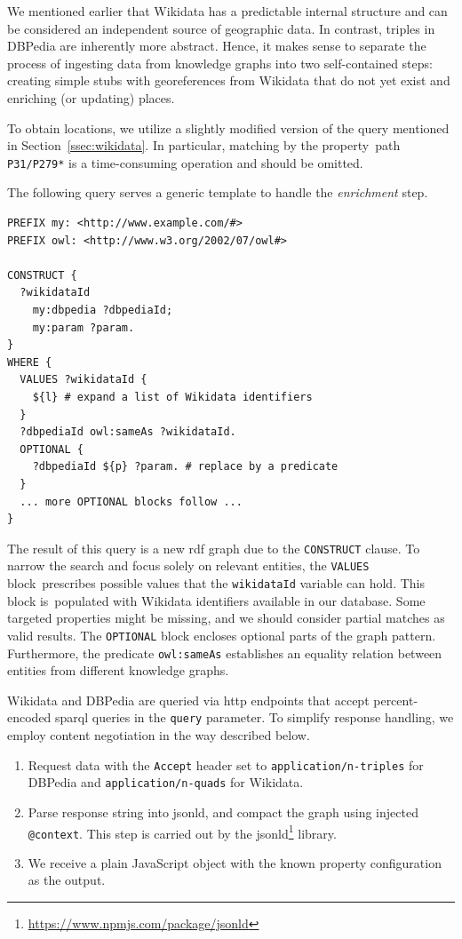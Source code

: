 We mentioned earlier that Wikidata has a predictable internal structure and can be considered an independent source of geographic data. In contrast, triples in DBPedia are inherently more abstract. Hence, it makes sense to separate the process of ingesting data from knowledge graphs into two self-contained steps: creating simple stubs with georeferences from Wikidata that do not yet exist and enriching (or updating) places.

To obtain locations, we utilize a slightly modified version of the query mentioned in Section~\ref{ssec:wikidata}. In particular, matching by the property~path \texttt{P31/P279*} is a time-consuming operation and should be omitted.

The following query serves a generic template to handle the \emph{enrichment} step.

\begin{verbatim}
PREFIX my: <http://www.example.com/#>
PREFIX owl: <http://www.w3.org/2002/07/owl#>

CONSTRUCT {
  ?wikidataId
    my:dbpedia ?dbpediaId;
    my:param ?param.
}
WHERE {
  VALUES ?wikidataId {
    ${l} # expand a list of Wikidata identifiers
  }
  ?dbpediaId owl:sameAs ?wikidataId.
  OPTIONAL {
    ?dbpediaId ${p} ?param. # replace by a predicate
  }
  ... more OPTIONAL blocks follow ...
}
\end{verbatim}

The result of this query is a new \acs{rdf} graph due to the \texttt{CONSTRUCT} clause. To narrow the search and focus solely on relevant entities, the \texttt{VALUES} block~pre\-scribes possible values that the \texttt{wikidataId} variable can hold. This block is~pop\-u\-lat\-ed with Wikidata identifiers available in our database. Some targeted properties might be missing, and we should consider partial matches as valid results. The \texttt{OPTIONAL} block encloses optional parts of the graph pattern. Furthermore, the predicate \texttt{owl:sameAs} establishes an equality relation between entities from different knowledge graphs.

Wikidata and DBPedia are queried via \acs{http} endpoints that accept percent-encoded \acs{sparql} queries in the \texttt{query} parameter. To simplify response handling, we employ content negotiation in the way described below.

\begin{enumerate}
\item Request data with the \texttt{Accept} header set to \texttt{application/n-triples} for DBPedia and \texttt{application/n-quads} for Wikidata.
\item Parse response string into \acs{jsonld}, and compact the graph using injected \texttt{@context}. This step is carried out by the jsonld\footnote{\href{https://www.npmjs.com/package/jsonld}{https://www.npmjs.com/package/jsonld}} library.
\item We receive a plain JavaScript object with the known property configuration as the output.
\end{enumerate}

